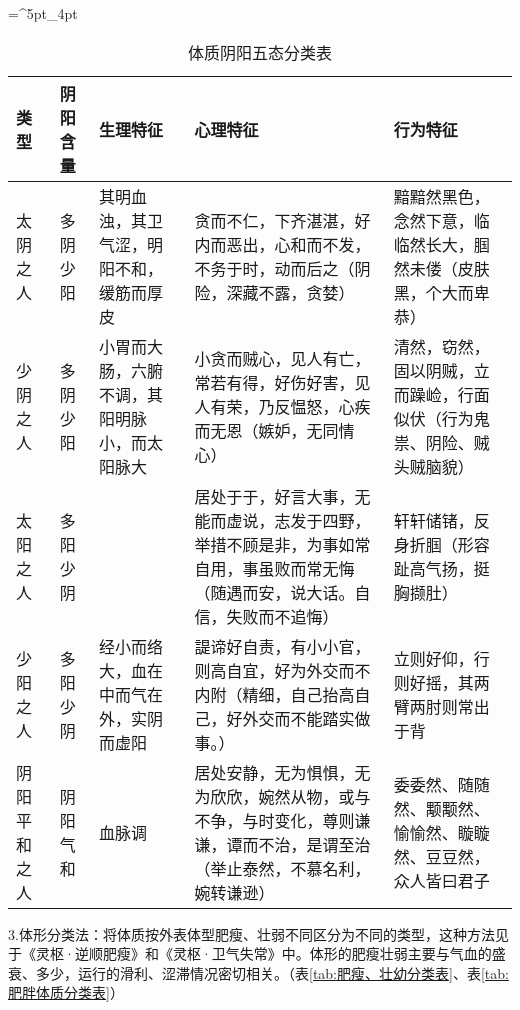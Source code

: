 \documentclass[draft,12pt]{ctexbook}
\begin{document}
\begin{table}[htb!p]%
	\centering
	\caption{体质阴阳五态分类表}\label{tab:体质阴阳五态分类表}
	\tabulinesep=^5pt_4pt
	\begin{tabu}{p{4em}p{4em}p{10em}p{9em}p{10em}}
		\toprule
		\rowfont[c]{}
		类型         & 阴阳含量 & 生理特征 & 心理特征 & 行为特征 \\
		\midrule
		太阴之人     & 多阴少阳 & 其明血浊，其卫气涩，明阳不和，缓筋而厚皮     & 贪而不仁，下齐湛湛，好内而恶出，心和而不发，不务于时，动而后之（阴险，深藏不露，贪婪）                                         & 黯黯然黑色，念然下意，临临然长大，腘然未偻（皮肤黑，个大而卑恭） \\
		少阴之人     & 多阴少阳 & 小胃而大肠，六腑不调，其阳明脉小，而太阳脉大 & 小贪而贼心，见人有亡，常若有得，好伤好害，见人有荣，乃反愠怒，心疾而无恩（嫉妒，无同情心）                                     & 清然，窃然，固以阴贼，立而躁崄，行面似伏（行为鬼祟、阴险、贼头贼脑貌） \\
		太阳之人     & 多阳少阴 &                                              & 居处于于，好言大事，无能而虚说，志发于四野，举措不顾是非，为事如常自用，事虽败而常无悔（随遇而安，说大话。自信，失败而不追悔） & 轩轩储锗，反身折腘（形容趾高气扬，挺胸撷肚） \\
		少阳之人     & 多阳少阴 & 经小而络大，血在中而气在外，实阴而虚阳       & 諟谛好自责，有小小官，则高自宜，好为外交而不内附（精细，自己抬高自己，好外交而不能踏实做事。）                                 & 立则好仰，行则好摇，其两臂两肘则常出于背 \\
		阴阳平和之人 & 阴阳气和 & 血脉调                                       & 居处安静，无为惧惧，无为欣欣，婉然从物，或与不争，与时变化，尊则谦谦，谭而不治，是谓至治（举止泰然，不慕名利，婉转谦逊）       & 委委然、随随然、颙颙然、愉愉然、䁢䁢然、豆豆然，众人皆曰君子 \\
		\bottomrule
	\end{tabu}
\end{table}

3.体形分类法：将体质按外表体型肥瘦、壮弱不同区分为不同的类型，这种方法见于《灵枢·逆顺肥瘦》和《灵枢·卫气失常》中。体形的肥瘦壮弱主要与气血的盛衰、多少，运行的滑利、涩滞情况密切相关。（表\ref{tab:肥瘦、壮幼分类表}、表\ref{tab:肥胖体质分类表}）
\end{document}
